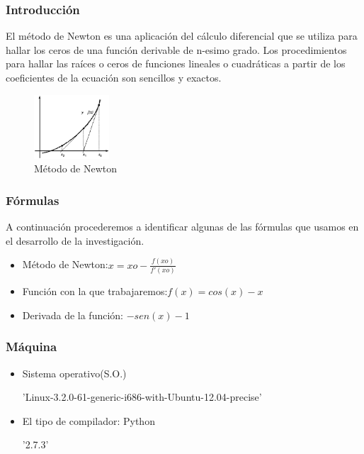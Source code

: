 \documentclass{beamer}
\begin{document}

\begin{frame}
\frametitle{Introducción}

El método de Newton es una aplicación del cálculo diferencial que se utiliza para hallar los ceros de una función derivable de n-esimo grado.
Los procedimientos para hallar las raíces o ceros de funciones lineales o cuadráticas a partir de los coeficientes de la ecuación son sencillos y exactos.

\begin{figure}[!th]
\begin{center}
\includegraphics[width=0.25\textwidth]{images/a.eps}
\caption{Método de Newton}
\end{center}
\end{figure}
\end{frame}





\begin{frame}
\frametitle{Fórmulas}
\begin{block}
A continuación procederemos a identificar algunas de las fórmulas que usamos en el desarrollo de la investigación.
%
%
%
%
%
\begin{itemize}
\item Método de Newton:$ x=xo-\frac{f(xo)}{f'(xo)} $ \pause
\item Función con la que trabajaremos:$f(x)=cos(x)-x$ \pause
\item Derivada de la función: $-sen(x)-1$ 

%
\end{itemize}
%
\end{block}
\end{frame}

\begin{frame}
\frametitle{Máquina}
\begin{itemize}

\item Sistema operativo(S.O.)

\centerline{'Linux-3.2.0-61-generic-i686-with-Ubuntu-12.04-precise'}
\vspace{1cm}
\item El tipo de compilador: Python 

\centerline{'2.7.3'}

\end{itemize}
\end{frame}
\end{document}
